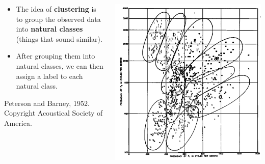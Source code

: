 \documentclass{beamer}
\begin{document}
\begin{frame}
  \begin{columns}
    \begin{column}{0.3\textwidth}
      \begin{itemize}
      \item The idea of {\bf clustering} is to group the observed data
        into {\bf natural classes} (things that sound similar).
      \item After grouping them into natural classes, we can then
        assign a label to each natural class.
      \end{itemize}

      {\tiny Peterson and Barney, 1952.  Copyright
      Acoustical Society of America.}
    \end{column}
    \begin{column}{0.7\textwidth}
      \begin{center}
        \includegraphics[width=\textwidth]{figs/peterson1952fig8.png}
      \end{center}
    \end{column}
  \end{columns}
\end{frame}
\end{document}
